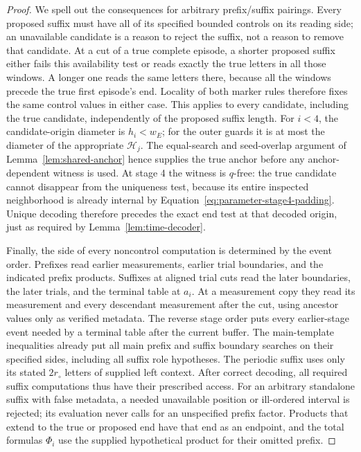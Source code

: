 \begin{proof}
We spell out the consequences for arbitrary prefix/suffix pairings.
Every proposed suffix must have all of its specified bounded
controls on its reading side; an unavailable candidate is a reason
to reject the suffix, not a reason to remove that candidate.
At a cut of a true complete episode, a shorter proposed suffix either
fails this availability test or reads exactly the true letters in
all those windows.  A longer one reads the same letters there,
because all the windows precede the true first episode's end.
Locality of both marker rules therefore fixes the same control values
in either case.  This applies to every candidate, including the true
candidate, independently of the proposed suffix length.
For \(i<4\), the candidate-origin diameter is \(h_i<w_E\); for the
outer guards it is at most the diameter of the appropriate
\(\mathcal H_j\).  The equal-search and seed-overlap argument of
Lemma~\ref{lem:shared-anchor} hence supplies the true anchor before
any anchor-dependent witness is used.  At stage 4 the witness is
\(q\)-free: the true candidate cannot disappear from the uniqueness
test, because its entire inspected neighborhood is already internal
by Equation~\eqref{eq:parameter-stage4-padding}.  Unique decoding
therefore precedes the exact end test at that decoded origin, just
as required by Lemma~\ref{lem:time-decoder}.

Finally, the side of every noncontrol computation is determined by
the event order.  Prefixes read earlier measurements, earlier trial
boundaries, and the indicated prefix products.  Suffixes at aligned
trial cuts read the later boundaries, the later trials, and the
terminal table at \(a_i\).  At a measurement copy they read its
measurement and every descendant measurement after the cut, using
ancestor values only as verified metadata.  The reverse stage order
puts every earlier-stage event needed by a terminal table after the
current buffer.  The main-template inequalities already put all
main prefix and suffix boundary searches on their specified sides,
including all suffix role hypotheses.  The periodic suffix uses
only its stated \(2r_\circ\) letters of supplied left context.
After correct decoding, all required suffix computations thus have
their prescribed access.  For an arbitrary standalone suffix with
false metadata, a needed unavailable position or ill-ordered
interval is rejected; its evaluation never calls for an unspecified
prefix factor.  Products that extend to the true or proposed end
have that end as an endpoint, and the total formulas \(\Phi_i\)
use the supplied hypothetical product for their omitted prefix.


\end{proof}
